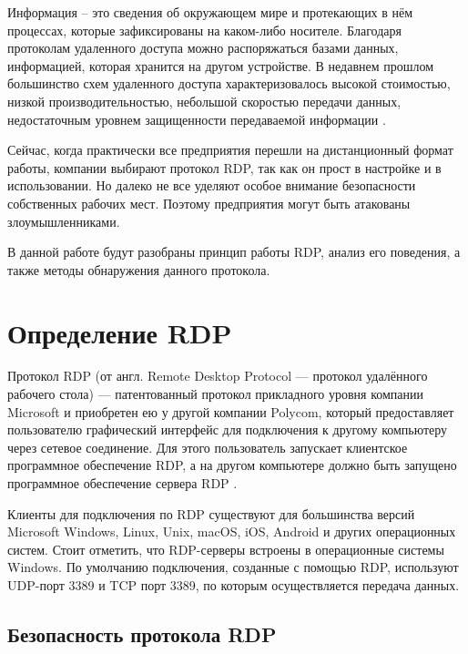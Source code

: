 \documentclass[bachelor, och, coursework]{SCWorks}
\begin{document}


\tableofcontents

\intro
Информация -- это сведения об окружающем мире и протекающих в нём процессах, которые зафиксированы на каком-либо носителе.
Благодаря протоколам удаленного доступа можно распоряжаться базами данных, информацией, которая хранится на другом устройстве. В недавнем прошлом большинство
схем удаленного доступа характеризовалось высокой стоимостью, низкой производительностью, небольшой скоростью передачи данных, недостаточным уровнем защищенности
передаваемой информации \cite{1}. 

Сейчас, когда практически все предприятия перешли на дистанционный формат работы, компании выбирают протокол RDP, так как он прост в настройке и в использовании.
Но далеко не все уделяют особое внимание безопасности собственных рабочих мест. Поэтому предприятия могут быть атакованы злоумышленниками.

В данной работе будут разобраны принцип работы RDP, анализ его поведения, а также методы обнаружения данного протокола.

\section{Определение RDP}

Протокол RDP (от англ. Remote Desktop Protocol --- протокол удалённого рабочего стола) --- патентованный протокол 
прикладного уровня компании Microsoft и приобретен ею у другой компании Polycom, который предоставляет пользователю графический интерфейс для 
подключения к другому компьютеру через сетевое соединение. Для этого пользователь запускает клиентское программное обеспечение RDP, а на другом 
компьютере должно быть запущено программное обеспечение сервера RDP \cite{2}.

Клиенты для подключения по RDP существуют для большинства версий Microsoft Windows, Linux, Unix, macOS, iOS, Android и 
других операционных систем. Стоит отметить, что RDP-серверы встроены в операционные системы Windows. По умолчанию подключения, созданные с 
помощью RDP, используют UDP-порт 3389 и TCP порт 3389, по которым осуществляется передача данных.

\subsection{Безопасность протокола RDP}
\end{document}
